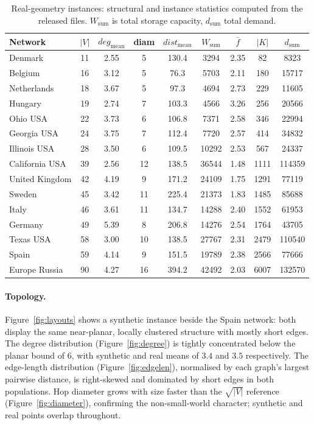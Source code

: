 \documentclass[11pt]{article}
\begin{document}
\begin{table}[t]
\centering
\caption{Real-geometry instances: structural and instance statistics computed
from the released files. $W_{\text{sum}}$ is total storage capacity,
$d_{\text{sum}}$ total demand.}
\label{tab:real}
\small
\begin{tabular}{lcccccccc}
\toprule
Network & $|V|$ & $deg_{\text{mean}}$ & diam & $dist_{\text{mean}}$ & $W_{\text{sum}}$ & $\bar f$ & $|K|$ & $d_{\text{sum}}$\\
\midrule
Denmark        & 11 & 2.55 & 5  & 130.4 & 3294  & 2.35 & 82   & 8323\\
Belgium        & 16 & 3.12 & 5  & 76.3  & 5703  & 2.11 & 180  & 15717\\
Netherlands    & 18 & 3.67 & 5  & 97.3  & 4694  & 2.73 & 229  & 11605\\
Hungary        & 19 & 2.74 & 7  & 103.3 & 4566  & 3.26 & 256  & 20566\\
Ohio USA        & 22 & 3.73 & 6  & 106.8 & 7371  & 2.58 & 346  & 22994\\
Georgia USA     & 24 & 3.75 & 7  & 112.4 & 7720  & 2.57 & 414  & 34832\\
Illinois USA    & 28 & 3.50 & 6  & 109.5 & 10292 & 2.53 & 567  & 24337\\
California USA   & 39 & 2.56 & 12 & 138.5 & 36544 & 1.48 & 1111 & 114359\\
United Kingdom & 42 & 4.19 & 9  & 171.2 & 24109 & 1.75 & 1291 & 77119\\
Sweden         & 45 & 3.42 & 11 & 225.4 & 21373 & 1.83 & 1485 & 85688\\
Italy          & 46 & 3.61 & 11 & 134.7 & 14288 & 2.40 & 1552 & 61953\\
Germany        & 49 & 5.39 & 8  & 206.8 & 14276 & 2.54 & 1764 & 43705\\
Texas USA       & 58 & 3.00 & 10 & 138.5 & 27767 & 2.31 & 2479 & 110540\\
Spain          & 59 & 4.14 & 9  & 151.5 & 19789 & 2.38 & 2566 & 77666\\
Europe Russia  & 90 & 4.27 & 16 & 394.2 & 42492 & 2.03 & 6007 & 132570\\
\bottomrule
\end{tabular}
\end{table}

\paragraph{Topology.}
Figure~\ref{fig:layouts} shows a synthetic instance beside the Spain network:
both display the same near-planar, locally clustered structure with mostly short
edges. The degree distribution (Figure~\ref{fig:degree}) is tightly concentrated
below the planar bound of $6$, with synthetic and real means of $3.4$ and $3.5$
respectively. The edge-length distribution (Figure~\ref{fig:edgelen}), normalised
by each graph's largest pairwise distance, is right-skewed and dominated by short
edges in both populations. Hop diameter grows with size faster than the
$\sqrt{|V|}$ reference (Figure~\ref{fig:diameter}), confirming the non-small-world
character; synthetic and real points overlap throughout.
\end{document}
